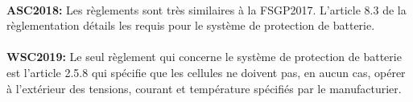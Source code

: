 		\paragraph{}
		\textbf{ASC2018:} Les règlements sont très similaires à la FSGP2017. L'article 8.3 de la règlementation détails les requis pour le système de protection de batterie. \cite{reg_asc2018}
		
		\paragraph{}
		\textbf{WSC2019:} Le seul règlement qui concerne le système de protection de batterie est l'article 2.5.8 qui spécifie que les cellules ne doivent pas, en aucun cas, opérer à l'extérieur des tensions, courant et température spécifiés par le manufacturier. \cite{reg_wsc2017}
